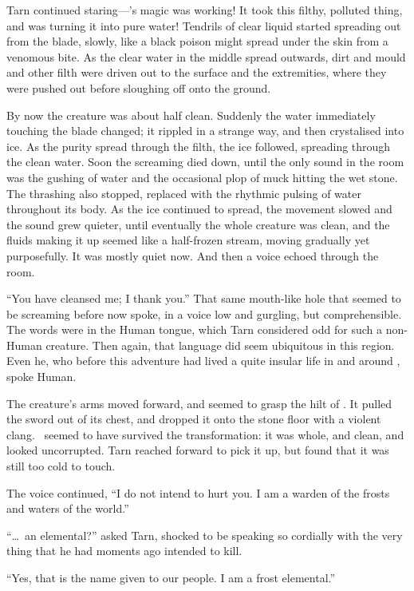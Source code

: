 Tarn continued staring---\kildir's magic was working!  It took this filthy, polluted thing, and was turning it into pure water!  Tendrils of clear liquid started spreading out from the blade, slowly, like a black poison might spread under the skin from a venomous bite.  As the clear water in the middle spread outwards, dirt and mould and other filth were driven out to the surface and the extremities, where they were pushed out before sloughing off onto the ground.

By now the creature was about half clean.  Suddenly the water immediately touching the blade changed; it rippled in a strange way, and then crystalised into ice.  As the purity spread through the filth, the ice followed, spreading through the clean water.  Soon the screaming died down, until the only sound in the room was the gushing of water and the occasional plop of muck hitting the wet stone.  The thrashing also stopped, replaced with the rhythmic pulsing of water throughout its body.  As the ice continued to spread, the movement slowed and the sound grew quieter, until eventually the whole creature was clean, and the fluids making it up seemed like a half-frozen stream, moving gradually yet purposefully.  It was mostly quiet now.  And then a voice echoed through the room.

``You have cleansed me; I thank you.''  That same mouth-like hole that seemed to be screaming before now spoke, in a voice low and gurgling, but comprehensible.  The words were in the Human tongue, which Tarn considered odd for such a non-Human creature.  Then again, that language did seem ubiquitous in this region.  Even he, who before this adventure had lived a quite insular life in and around \korbarthrond, spoke Human.

The creature's arms moved forward, and seemed to grasp the hilt of \kildir.  It pulled the sword out of its chest, and dropped it onto the stone floor with a violent clang.  \kildir\ seemed to have survived the transformation: it was whole, and clean, and looked uncorrupted.  Tarn reached forward to pick it up, but found that it was still too cold to touch.

The voice continued, ``I do not intend to hurt you.  I am a warden of the frosts and waters of the world.''

``\ldots\ an elemental?'' asked Tarn, shocked to be speaking so cordially with the very thing that he had moments ago intended to kill.

``Yes, that is the name given to our people.  I am a frost elemental.''

